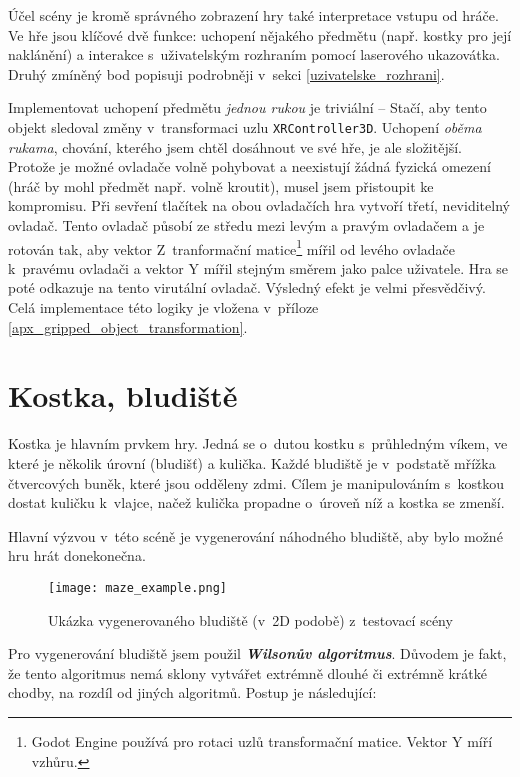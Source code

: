 Účel scény je kromě správného zobrazení hry také interpretace vstupu od hráče. Ve hře jsou klíčové dvě funkce: uchopení nějakého předmětu (např. kostky pro její naklánění) a interakce s~uživatelským rozhraním pomocí laserového ukazovátka. Druhý zmíněný bod popisuji podrobněji v~sekci \ref{uzivatelske_rozhrani}.

Implementovat uchopení předmětu \textit{jednou rukou} je triviální -- Stačí, aby tento objekt sledoval změny v~transformaci uzlu \texttt{XRController3D}. Uchopení \textit{oběma rukama}, chování, kterého jsem chtěl dosáhnout ve své hře, je ale složitější. Protože je možné ovladače volně pohybovat a neexistují žádná fyzická omezení (hráč by mohl předmět např. volně kroutit), musel jsem přistoupit ke kompromisu. Při sevření tlačítek na obou ovladačích hra vytvoří třetí, neviditelný ovladač. Tento ovladač působí ze středu mezi levým a pravým ovladačem a je rotován tak, aby vektor Z~tranformační matice\footnote{Godot Engine používá pro rotaci uzlů transformační matice. Vektor Y míří vzhůru.} mířil od levého ovladače k~pravému ovladači a vektor Y mířil stejným směrem jako palce uživatele. Hra se poté odkazuje na tento virutální ovladač. Výsledný efekt je velmi přesvědčivý. Celá implementace této logiky je vložena v~příloze \ref{apx_gripped_object_transformation}.

\section{Kostka, bludiště}

Kostka je hlavním prvkem hry. Jedná se o~dutou kostku s~průhledným víkem, ve které je několik úrovní (bludišť) a kulička. Každé bludiště je v~podstatě mřížka čtvercových buněk, které jsou odděleny zdmi. Cílem je manipulováním s~kostkou dostat kuličku k~vlajce, načež kulička propadne o~úroveň níž a kostka se zmenší.

Hlavní výzvou v~této scéně je vygenerování náhodného bludiště, aby bylo možné hru hrát donekonečna.

\begin{figure}[H]
  \centering
  \texttt{[image: maze\_example.png]}
  \caption{Ukázka vygenerovaného bludiště (v~2D podobě) z~testovací scény}
  \label{maze_example}
\end{figure}

Pro vygenerování bludiště jsem použil \textit{\textbf{Wilsonův algoritmus}}. Důvodem je fakt, že tento algoritmus nemá sklony vytvářet extrémně dlouhé či extrémně krátké chodby, na rozdíl od jiných algoritmů. Postup je následující: \cite{enwiki:1193338583}

